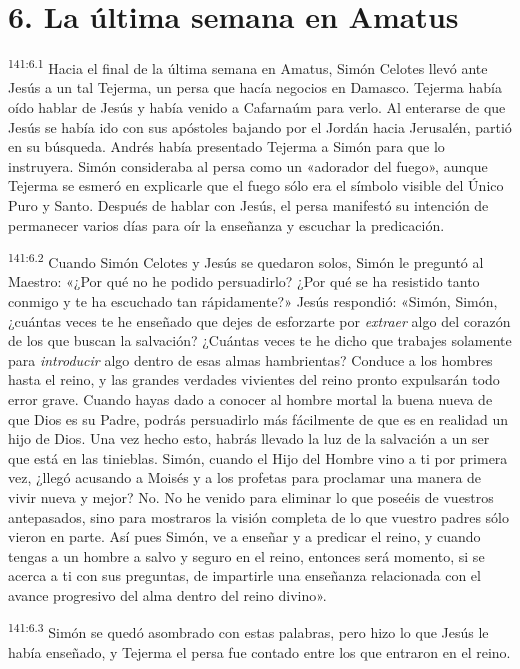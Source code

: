 \section*{6. La última semana en Amatus}
\par
\textsuperscript{141:6.1} Hacia el final de la última semana en Amatus, Simón Celotes llevó ante Jesús a un tal Tejerma, un persa que hacía negocios en Damasco. Tejerma había oído hablar de Jesús y había venido a Cafarnaúm para verlo. Al enterarse de que Jesús se había ido con sus apóstoles bajando por el Jordán hacia Jerusalén, partió en su búsqueda. Andrés había presentado Tejerma a Simón para que lo instruyera. Simón consideraba al persa como un «adorador del fuego», aunque Tejerma se esmeró en explicarle que el fuego sólo era el símbolo visible del Único Puro y Santo. Después de hablar con Jesús, el persa manifestó su intención de permanecer varios días para oír la enseñanza y escuchar la predicación.

\par
\textsuperscript{141:6.2} Cuando Simón Celotes y Jesús se quedaron solos, Simón le preguntó al Maestro: «¿Por qué no he podido persuadirlo? ¿Por qué se ha resistido tanto conmigo y te ha escuchado tan rápidamente?» Jesús respondió: «Simón, Simón, ¿cuántas veces te he enseñado que dejes de esforzarte por \textit{extraer} algo del corazón de los que buscan la salvación? ¿Cuántas veces te he dicho que trabajes solamente para \textit{introducir} algo dentro de esas almas hambrientas? Conduce a los hombres hasta el reino, y las grandes verdades vivientes del reino pronto expulsarán todo error grave. Cuando hayas dado a conocer al hombre mortal la buena nueva de que Dios es su Padre, podrás persuadirlo más fácilmente de que es en realidad un hijo de Dios. Una vez hecho esto, habrás llevado la luz de la salvación a un ser que está en las tinieblas. Simón, cuando el Hijo del Hombre vino a ti por primera vez, ¿llegó acusando a Moisés y a los profetas para proclamar una manera de vivir nueva y mejor? No. No he venido para eliminar lo que poseéis de vuestros antepasados, sino para mostraros la visión completa de lo que vuestro padres sólo vieron en parte. Así pues Simón, ve a enseñar y a predicar el reino, y cuando tengas a un hombre a salvo y seguro en el reino, entonces será momento, si se acerca a ti con sus preguntas, de impartirle una enseñanza relacionada con el avance progresivo del alma dentro del reino divino».

\par
\textsuperscript{141:6.3} Simón se quedó asombrado con estas palabras, pero hizo lo que Jesús le había enseñado, y Tejerma el persa fue contado entre los que entraron en el reino.

